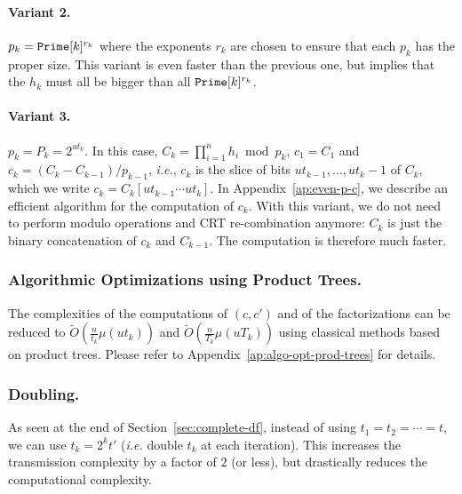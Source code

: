 \documentclass[twoside,envcountsame,runningheads]{llncs}
\newcommand{\Oapp}{\ensuremath{\tilde{O}}}
\newcommand{\ie}{\textit{i.e.}\xspace}
\newcommand{\apref}[1]{Appendix~\ref{#1}}
\newcommand{\apref}[1]{the full version~\cite{X:ABBMNR13}}
\begin{document}
\paragraph{Variant 2.} $p_k=\mbox{{\tt Prime}}[k]^{r_k}$ where the exponents $r_k$ are chosen to ensure that each $p_k$ has the proper size.
This variant is even faster than the previous one, but implies that the $h_k$ must all be bigger than all
$\mbox{{\tt Prime}}[k]^{r_k}$.

\paragraph{Variant 3.} $p_k = P_k = 2^{ut_k}$. 
In this case, $C_k = \prod_{i=1}^n h_i \bmod p_k$, $c_1 = C_1$ and $c_k = (C_k - C_{k-1}) / p_{k-1}$, {\it i.e.}, $c_k$ is the slice of bits $ut_{k-1}, \dots, ut_k-1$ of $C_k$, which we write $c_k = C_k[ut_{k-1}\cdots ut_k]$.
In \apref{ap:even-p-c}, we describe an efficient algorithm for the computation of $c_k$.
With this variant, we do not need to perform modulo operations and CRT re-combination anymore: $C_k$ is just the binary concatenation of $c_k$ and $C_{k-1}$. The computation is therefore much faster.


\subsubsection{Algorithmic Optimizations using Product Trees.}
\label{sec:algo-opt-prod-trees}

The complexities of the computations of $(c,c')$ and of the factorizations can be reduced to $\Oapp(\frac{n}{t_k} \mu(u t_k))$ and $\Oapp(\frac{n}{T_k} \mu(u T_k))$ using classical methods based on product trees. 
Please refer to \apref{ap:algo-opt-prod-trees} for details.

\subsubsection{Doubling.}
\label{sec:doubling}

As seen at the end of Section~\ref{sec:complete-df}, instead of using $t_1 = t_2 = \cdots = t$, we can use $t_k = 2^k t'$ (\ie double $t_k$ at each iteration).
This increases the transmission complexity by a factor of $2$ (or less), but drastically reduces the computational complexity.
\end{document}
